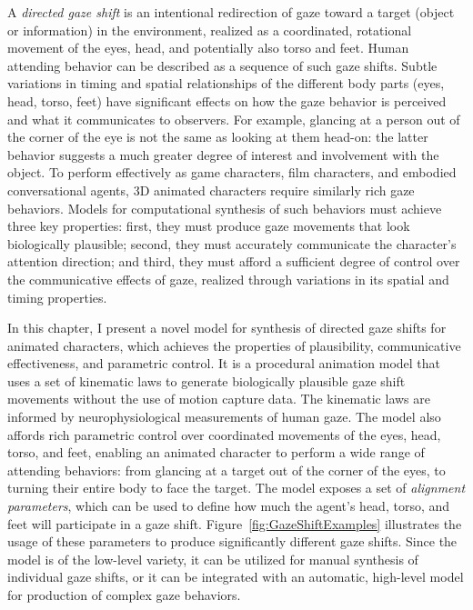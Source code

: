 A \emph{directed gaze shift} is an intentional redirection of gaze toward a target (object or information) in the environment, realized as a coordinated, rotational movement of the eyes, head, and potentially also torso and feet. Human attending behavior can be described as a sequence of such gaze shifts. Subtle variations in timing and spatial relationships of the different body parts (eyes, head, torso, feet) have significant effects on how the gaze behavior is perceived and what it communicates to observers. For example, glancing at a person out of the corner of the eye is not the same as looking at them head-on: the latter behavior suggests a much greater degree of interest and involvement with the object. To perform effectively as game characters, film characters, and embodied conversational agents, 3D animated characters require similarly rich gaze behaviors. Models for computational synthesis of such behaviors must achieve three key properties: first, they must produce gaze movements that look biologically plausible; second, they must accurately communicate the character's attention direction; and third, they must afford a sufficient degree of control over the communicative effects of gaze, realized through variations in its spatial and timing properties.

In this chapter, I present a novel model for synthesis of directed gaze shifts for animated characters, which achieves the properties of plausibility, communicative effectiveness, and parametric control. It is a procedural animation model that uses a set of kinematic laws to generate biologically plausible gaze shift movements without the use of motion capture data. The kinematic laws are informed by neurophysiological measurements of human gaze. The model also affords rich parametric control over coordinated movements of the eyes, head, torso, and feet, enabling an animated character to perform a wide range of attending behaviors: from glancing at a target out of the corner of the eyes, to turning their entire body to face the target. The model exposes a set of \emph{alignment parameters}, which can be used to define how much the agent's head, torso, and feet will participate in a gaze shift. Figure~\ref{fig:GazeShiftExamples} illustrates the usage of these parameters to produce significantly different gaze shifts. Since the model is of the low-level variety, it can be utilized for manual synthesis of individual gaze shifts, or it can be integrated with an automatic, high-level model for production of complex gaze behaviors.

